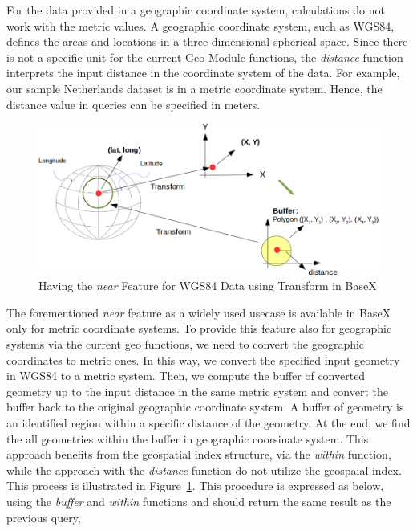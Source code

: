 \documentclass[a4paper,12pt]{article}
\begin{document}
For the data provided in a geographic coordinate system, calculations do not work with the metric values. A geographic coordinate system, such as WGS84, defines the areas and locations in a three-dimensional spherical space. Since there is not a specific unit for the current Geo Module functions, the \textit{distance} function interprets the input distance in the coordinate system of the data. For example, our sample Netherlands dataset is in a metric coordinate system. Hence,  the distance value in queries can be specified in meters. %

\begin{figure}
\centering
\includegraphics[width=\textwidth]{Transform}
\caption{Having the \textit{near} Feature for WGS84 Data using Transform in BaseX}
\label{figTransform}
\end{figure}

The forementioned \textit{near} feature as a widely used usecase is available in BaseX only for metric coordinate systems. To provide this feature also for geographic systems via the current geo functions, we need to convert the geographic coordinates to metric ones. In this way, we convert the specified input geometry in WGS84 to a metric system. Then, we compute the buffer of converted geometry up to the input distance in the same metric system and convert the buffer back to the original geographic coordinate system. A buffer of geometry is an identified region within a specific distance of the geometry. At the end, we find the all geometries within the buffer in geographic coorsinate system. This approach benefits from the geospatial index structure, via the \textit{within} function, while the approach with the \textit{distance} function do not utilize the geospaial index. This process is illustrated in Figure~\ref{figTransform}. 
This procedure is expressed as below, using the \textit{buffer} and \textit{within} functions and should return the same result as the previous query, 
\end{document}
